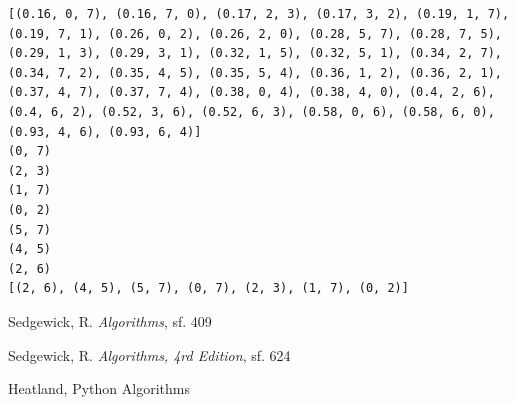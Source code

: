 \documentclass[12pt,fleqn]{article}\usepackage{../common}
\begin{document}
\begin{verbatim}
[(0.16, 0, 7), (0.16, 7, 0), (0.17, 2, 3), (0.17, 3, 2), (0.19, 1, 7), (0.19, 7, 1), (0.26, 0, 2), (0.26, 2, 0), (0.28, 5, 7), (0.28, 7, 5), (0.29, 1, 3), (0.29, 3, 1), (0.32, 1, 5), (0.32, 5, 1), (0.34, 2, 7), (0.34, 7, 2), (0.35, 4, 5), (0.35, 5, 4), (0.36, 1, 2), (0.36, 2, 1), (0.37, 4, 7), (0.37, 7, 4), (0.38, 0, 4), (0.38, 4, 0), (0.4, 2, 6), (0.4, 6, 2), (0.52, 3, 6), (0.52, 6, 3), (0.58, 0, 6), (0.58, 6, 0), (0.93, 4, 6), (0.93, 6, 4)]
(0, 7)
(2, 3)
(1, 7)
(0, 2)
(5, 7)
(4, 5)
(2, 6)
[(2, 6), (4, 5), (5, 7), (0, 7), (2, 3), (1, 7), (0, 2)]
\end{verbatim}


















Sedgewick, R. {\em Algorithms}, sf. 409

Sedgewick, R. {\em Algorithms, 4rd Edition}, sf. 624

Heatland, Python Algorithms
\end{document}

